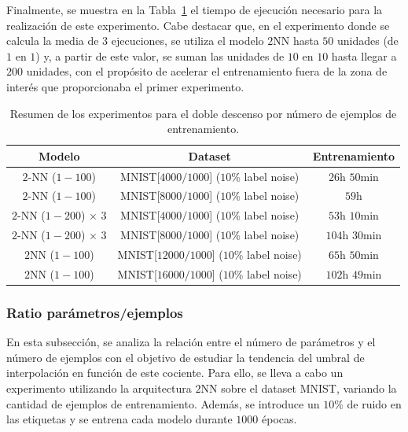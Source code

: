 Finalmente, se muestra en la Tabla~\ref{tab:model_training_time} el tiempo de ejecución necesario para la realización de este experimento. Cabe destacar que, en el experimento donde se calcula la media de $3$ ejecuciones, se utiliza el modelo $2$NN hasta $50$ unidades (de $1$ en $1$) y, a partir de este valor, se suman las unidades de $10$ en $10$ hasta llegar a $200$ unidades, con el propósito de acelerar el entrenamiento fuera de la zona de interés que proporcionaba el primer experimento.\newline

\begin{table}[h!]
\centering
\begin{tabular}{|c|c|c|}
\hline
\textbf{Modelo}       & \textbf{Dataset} & \textbf{Entrenamiento} \\ 
\hline
$2$-NN ($1-100$)      & MNIST[$4000/1000$] ($10$\% label noise)        & $26$h $50$min       \\ 
$2$-NN ($1-100$)      & MNIST[$8000/1000$]  ($10$\% label noise)       & $59$h       \\ 
$2$-NN ($1-200$) $\times$ $3$     & MNIST[$4000/1000$]  ($10$\% label noise)       & $53$h $10$min       \\ 
$2$-NN ($1-200$) $\times$ $3$      & MNIST[$8000/1000$]  ($10$\% label noise)       & $104$h $30$min       \\ 
$2$NN ($1-100$)          & MNIST[$12000/1000$] ($10$\% label noise)   & $65$h $50$min   \\ 
$2$NN ($1-100$)          & MNIST[$16000/1000$] ($10$\% label noise)   & $102$h $49$min   \\ 
\hline
\end{tabular}
\caption[Resumen de los experimentos para el doble descenso por número de ejemplos de entrenamiento.]{Resumen de los experimentos para el doble descenso por número de ejemplos de entrenamiento.}\label{tab:model_training_time}
\end{table}

\subsubsection{Ratio parámetros/ejemplos}\label{subsubsec:ratio-parametros-ejemplos}

En esta subsección, se analiza la relación entre el número de parámetros y el número de ejemplos con el objetivo de estudiar la tendencia del umbral de interpolación en función de este cociente. Para ello, se lleva a cabo un experimento utilizando la arquitectura $2$NN sobre el dataset MNIST, variando la cantidad de ejemplos de entrenamiento. Además, se introduce un $10\%$ de ruido en las etiquetas y se entrena cada modelo durante $1000$ épocas.\newline

